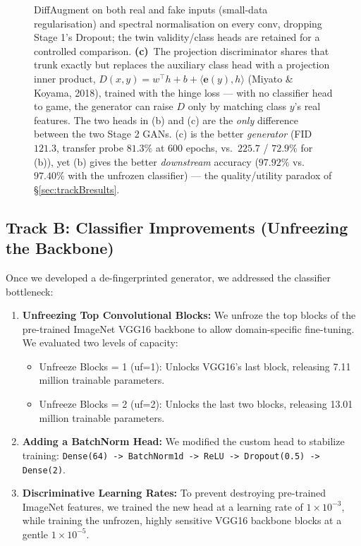 \documentclass[11pt]{article}
\newcommand{\code}[1]{\texttt{#1}}
\begin{document}
\begin{figure}[htbp]
{DiffAugment on both real and fake inputs (small-data regularisation) and spectral
normalisation on every conv, dropping Stage 1's Dropout; the twin validity/class
heads are retained for a controlled comparison. \textbf{(c)}~The projection
discriminator shares that trunk exactly but replaces the auxiliary class head with
a projection inner product, $D(x,y)=w^{\!\top}h+b+\langle \mathbf{e}(y),h\rangle$
(Miyato \& Koyama, 2018), trained with the hinge loss --- with no classifier head
to game, the generator can raise $D$ only by matching class $y$'s real features.
The two heads in (b) and (c) are the \emph{only} difference between the two Stage 2
GANs. (c) is the better \emph{generator} (FID $121.3$, transfer probe $81.3\%$ at
600 epochs, vs.\ $225.7$ / $72.9\%$ for (b)), yet (b) gives the better
\emph{downstream} accuracy ($97.92\%$ vs.\ $97.40\%$ with the unfrozen classifier)
--- the quality/utility paradox of \S\ref{sec:trackBresults}.}
\label{fig:arch-improved}
\end{figure}

\subsection{Track B: Classifier Improvements (Unfreezing the Backbone)}
Once we developed a de-fingerprinted generator, we addressed the classifier bottleneck:
\begin{enumerate}[nosep, leftmargin=1.5em]
  \item \textbf{Unfreezing Top Convolutional Blocks:} We unfroze the top blocks of the pre-trained ImageNet VGG16 backbone to allow domain-specific fine-tuning. We evaluated two levels of capacity:
  \begin{itemize}[nosep, leftmargin=1.5em]
    \item Unfreeze Blocks = 1 (uf=1): Unlocks VGG16's last block, releasing 7.11 million trainable parameters.
    \item Unfreeze Blocks = 2 (uf=2): Unlocks the last two blocks, releasing 13.01 million trainable parameters.
  \end{itemize}
  \item \textbf{Adding a BatchNorm Head:} We modified the custom head to stabilize training: \code{Dense(64) -> BatchNorm1d -> ReLU -> Dropout(0.5) -> Dense(2)}.
  \item \textbf{Discriminative Learning Rates:} To prevent destroying pre-trained ImageNet features, we trained the new head at a learning rate of $1 \times 10^{-3}$, while training the unfrozen, highly sensitive VGG16 backbone blocks at a gentle $1 \times 10^{-5}$.
\end{enumerate}
\end{document}
